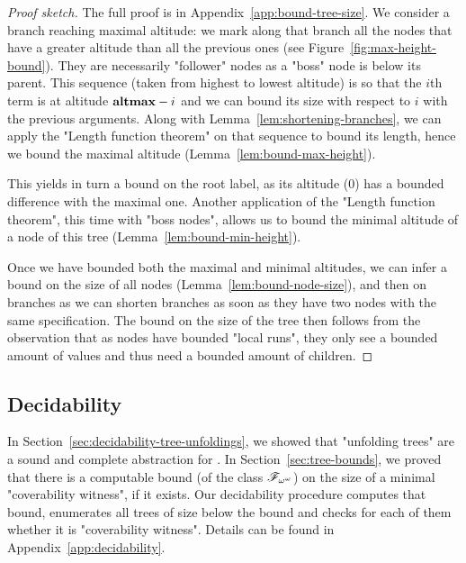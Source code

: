 \begin{proof}[Proof sketch]
	The full proof is in Appendix~\ref{app:bound-tree-size}.
	We consider a branch reaching maximal altitude: we mark along that branch all the nodes that have a greater altitude than all the previous ones (see Figure~\ref{fig:max-height-bound}). They are necessarily "follower" nodes as a "boss" node is below its parent. This sequence (taken from highest to lowest altitude) is so that the $i$th term is at altitude $\mathbf{altmax}-i$ and we can bound its size with respect to $i$ with the previous arguments. Along with Lemma~\ref{lem:shortening-branches}, we can apply the "Length function theorem" on that sequence to bound its length, hence we bound the maximal altitude (Lemma~\ref{lem:bound-max-height}).
	
	This yields in turn a bound on the root label, as its altitude ($0$) has a bounded difference with the maximal one. Another application of the "Length function theorem", this time with "boss nodes", allows us to bound the minimal altitude of a node of this tree (Lemma~\ref{lem:bound-min-height}).
	
	Once we have bounded both the maximal and minimal altitudes, we can infer a bound on the size of all nodes (Lemma~\ref{lem:bound-node-size}), and then on branches as we can shorten branches as soon as they have two nodes with the same specification.
	The bound on the size of the tree then follows from the observation that as nodes have bounded "local runs", they only see a bounded amount of values and thus need a bounded amount of children.
\end{proof}


\subsection{Decidability}
\label{sec:decidability-end}

In Section~\ref{sec:decidability-tree-unfoldings}, we showed that "unfolding trees" are a sound and complete abstraction for \COVER. In Section~\ref{sec:tree-bounds}, we proved that there is a computable bound (of the class $\mathscr{F}_{\omega^\omega}$) on the size of a minimal "coverability witness", if it exists. Our decidability procedure computes that bound, enumerates all trees of size below the bound and checks for each of them whether it is "coverability witness". Details can be found in Appendix~\ref{app:decidability}.

\decidablecover*


